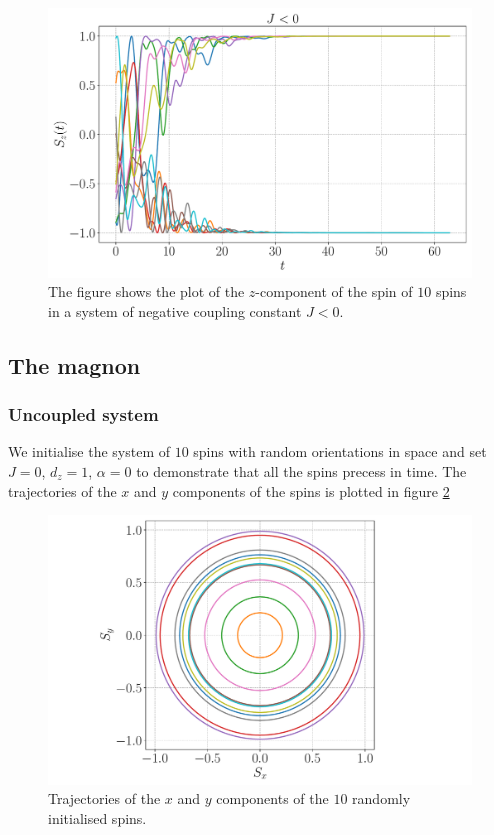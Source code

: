 \begin{figure}[htb]
	\centering
	\includegraphics[width=\columnwidth]{../fig/gs_antiferro.pdf}
	\caption{The figure shows the plot of the $z$-component of the spin of $10$ spins in a system of negative coupling constant $J < 0$.}
	\label{fig:antiferro}
\end{figure}

\subsection{The magnon}

\subsubsection{Uncoupled system}

We initialise the system of $10$ spins with random orientations in space and set $J = 0$, $d_z = 1$, $\alpha = 0$ to demonstrate that all the spins precess in time. The trajectories of the $x$ and $y$ components of the spins is plotted in figure \ref{fig:precessionsxy}

\begin{figure}[htb]
	\centering
	\includegraphics[width=0.8\columnwidth]{../fig/precession_xy.pdf}
	\caption{Trajectories of the $x$ and $y$ components of the $10$ randomly initialised spins.}
	\label{fig:precessionsxy}
\end{figure}

